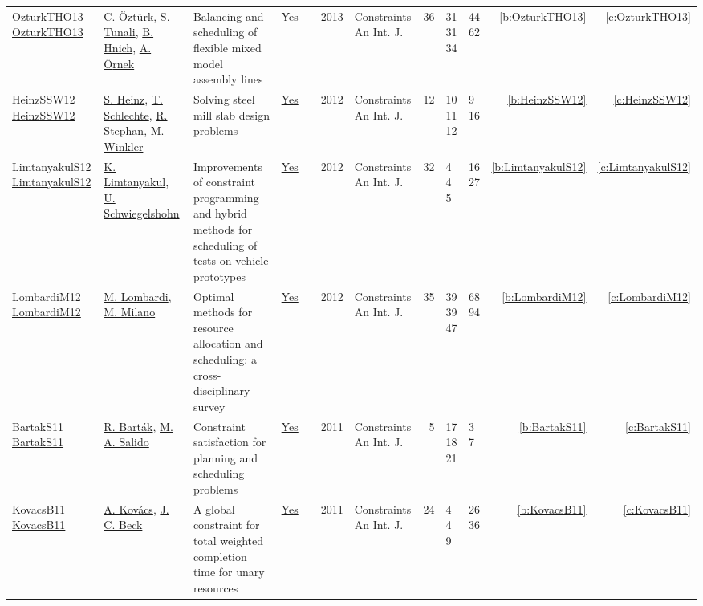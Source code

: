 {\begin{longtable}{>{\raggedright\arraybackslash}p{3cm}>{\raggedright\arraybackslash}p{4.5cm}>{\raggedright\arraybackslash}p{6.0cm}rrrp{2.5cm}rp{1cm}p{1cm}rr}
OzturkTHO13 \href{https://doi.org/10.1007/s10601-013-9142-6}{OzturkTHO13} & \hyperref[auth:a135]{C. {\"{O}}zt{\"{u}}rk}, \hyperref[auth:a136]{S. Tunali}, \hyperref[auth:a137]{B. Hnich}, \hyperref[auth:a138]{A. {\"{O}}rnek} & Balancing and scheduling of flexible mixed model assembly lines & \href{../works/OzturkTHO13.pdf}{Yes} & \cite{OzturkTHO13} & 2013 & Constraints An Int. J. & 36 & 31 31 34 & 44 62 & \ref{b:OzturkTHO13} & \ref{c:OzturkTHO13}\\
HeinzSSW12 \href{https://doi.org/10.1007/s10601-011-9113-8}{HeinzSSW12} & \hyperref[auth:a133]{S. Heinz}, \hyperref[auth:a139]{T. Schlechte}, \hyperref[auth:a140]{R. Stephan}, \hyperref[auth:a141]{M. Winkler} & Solving steel mill slab design problems & \href{../works/HeinzSSW12.pdf}{Yes} & \cite{HeinzSSW12} & 2012 & Constraints An Int. J. & 12 & 10 11 12 & 9 16 & \ref{b:HeinzSSW12} & \ref{c:HeinzSSW12}\\
LimtanyakulS12 \href{https://doi.org/10.1007/s10601-012-9118-y}{LimtanyakulS12} & \hyperref[auth:a144]{K. Limtanyakul}, \hyperref[auth:a145]{U. Schwiegelshohn} & Improvements of constraint programming and hybrid methods for scheduling of tests on vehicle prototypes & \href{../works/LimtanyakulS12.pdf}{Yes} & \cite{LimtanyakulS12} & 2012 & Constraints An Int. J. & 32 & 4 4 5 & 16 27 & \ref{b:LimtanyakulS12} & \ref{c:LimtanyakulS12}\\
LombardiM12 \href{https://doi.org/10.1007/s10601-011-9115-6}{LombardiM12} & \hyperref[auth:a142]{M. Lombardi}, \hyperref[auth:a143]{M. Milano} & Optimal methods for resource allocation and scheduling: a cross-disciplinary survey & \href{../works/LombardiM12.pdf}{Yes} & \cite{LombardiM12} & 2012 & Constraints An Int. J. & 35 & 39 39 47 & 68 94 & \ref{b:LombardiM12} & \ref{c:LombardiM12}\\
BartakS11 \href{https://doi.org/10.1007/s10601-011-9109-4}{BartakS11} & \hyperref[auth:a152]{R. Bart{\'{a}}k}, \hyperref[auth:a153]{M. A. Salido} & \cellcolor{green!10}Constraint satisfaction for planning and scheduling problems & \href{../works/BartakS11.pdf}{Yes} & \cite{BartakS11} & 2011 & Constraints An Int. J. & 5 & 17 18 21 & 3 7 & \ref{b:BartakS11} & \ref{c:BartakS11}\\
KovacsB11 \href{https://doi.org/10.1007/s10601-009-9088-x}{KovacsB11} & \hyperref[auth:a146]{A. Kov{\'{a}}cs}, \hyperref[auth:a89]{J. C. Beck} & A global constraint for total weighted completion time for unary resources & \href{../works/KovacsB11.pdf}{Yes} & \cite{KovacsB11} & 2011 & Constraints An Int. J. & 24 & 4 4 9 & 26 36 & \ref{b:KovacsB11} & \ref{c:KovacsB11}\\

\end{longtable}}
